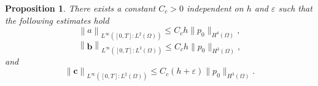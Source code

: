 \documentclass[a4paper,french,english,10pt]{article}
\newcommand\eps{\varepsilon}
\newtheorem{proposition}[theorem]{Proposition}
\begin{document}
\begin{proposition}\label{consistency}
There exists a constant $C_c>0$ independent  on $h$ and $\varepsilon$  such that the following 
estimates hold
\begin{equation} \label{eq:d20}
\left\|a \right\|_{L^\infty([0,T]:L^2(\Omega))}
\leq C_c h  \| p_0 \|_{H^4(\Omega)},
\end{equation}
\begin{equation} \label{eq:d22}
\left\|\mathbf b \right\|_{L^\infty([0,T]:L^2(\Omega))}
 \leq C_c h \| p_0 \|_{H^3(\Omega)} ,
\end{equation}
and
\begin{equation} \label{eq:d21}
\left\|\mathbf c \right\|_{L^\infty([0,T]:L^2(\Omega))}
 \leq C_c(h+\eps) \| p_0 \|_{H^3(\Omega)}.
\end{equation}
\end{proposition}
\end{document}

